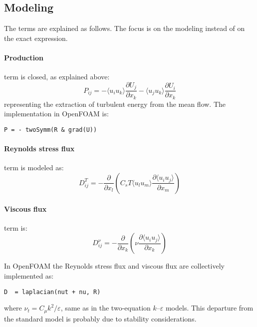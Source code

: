 \documentclass[11pt]{article}
\begin{document}
\subsection{Modeling}
The terms are explained as follows. The focus is on the modeling instead of on the exact expression.

\paragraph{Production} term is closed, as explained above:
\begin{equation}
P_{ij} = - \langle u_{i} u_{k} \rangle \frac{\partial U_{j}}{\partial x_{k}} - \langle u_{j} u_{k} \rangle \frac{\partial U_{i}}{\partial x_{k}}
\end{equation}
representing the extraction of turbulent energy from the mean flow. The implementation in OpenFOAM is:
\begin{center}
\verb+P = - twoSymm(R & grad(U))+
\end{center}

\paragraph{Reynolds stress flux} term is modeled as:
\begin{equation}
D_{ij}^{T} = -  \frac{\partial} {\partial x_{l}} \left( C_{s} T \langle u_{l} u_{m} \rangle \frac{\partial \langle u_{i} u_{j} \rangle}{\partial x_{m}} \right)
\end{equation}

\paragraph{Viscous flux} term is:
\begin{equation}
D_{ij}^{\nu} = -  \frac{\partial} {\partial x_{k}}\left( \nu \frac{\partial \langle u_{i} u_{j} \rangle}{\partial x_{k}} \right)
\end{equation}

In OpenFOAM the Reynolds stress flux and viscous flux are collectively implemented as:
\begin{center}
\verb#D  = laplacian(nut + nu, R)#
\end{center}
where $\nu_{t} = C_{\mu} k^{2} / \varepsilon$, same as in the two-equation $k$--$\varepsilon$ models. This departure from the standard model is probably due to stability considerations.
\end{document}
